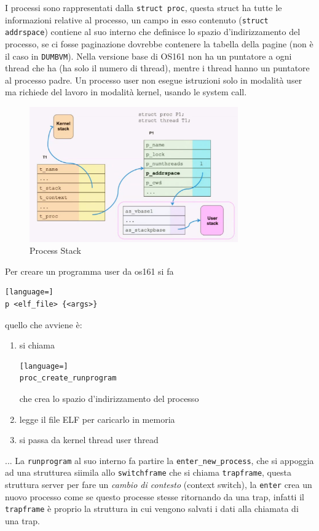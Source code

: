 \documentclass[12pt]{article}
\begin{document}
I processi sono rappresentati dalla \texttt{struct proc}, questa struct ha tutte le informazioni relative al processo, un campo in esso contenuto (\texttt{struct addrspace}) contiene al suo interno che definisce lo spazio d'indirizzamento del processo, se ci fosse paginazione dovrebbe contenere la tabella della pagine (non \`e il caso in \texttt{DUMBVM}). Nella versione base di OS161 non ha un puntatore a ogni thread che ha (ha solo il numero di thread), mentre i thread hanno un puntatore al processo padre. Un processo user non esegue istruzioni solo in modalit\`a user ma richiede del lavoro in modalit\`a kernel, usando le system call.
\begin{figure}[H]
  \centering
  \includegraphics[width=0.8\textwidth]{process-stack.png}
  \caption{Process Stack}
  \label{fig:process-stack}
\end{figure}
Per creare un programma user da os161 si fa
\begin{lstlisting}[language=]
p <elf_file> {<args>}
\end{lstlisting}
quello che avviene \`e:
\begin{enumerate}
  \item si chiama 
\begin{lstlisting}[language=]
proc_create_runprogram
\end{lstlisting}
    che crea lo spazio d'indirizzamento del processo
  \item legge il file ELF per caricarlo in memoria
  \item si passa da kernel thread user thread
\end{enumerate}
...
La \texttt{runprogram} al suo interno fa partire la \texttt{enter\_new\_process}, che si appoggia ad una strutturea siimila allo \texttt{switchframe} che si chiama \texttt{trapframe}, questa struttura server per fare un \emph{cambio di contesto} (context switch), la \texttt{enter} crea un nuovo processo come se questo processe stesse ritornando da una trap, infatti il \texttt{trapframe} \`e proprio la struttura in cui vengono salvati i dati alla chiamata di una trap.
\end{document}
